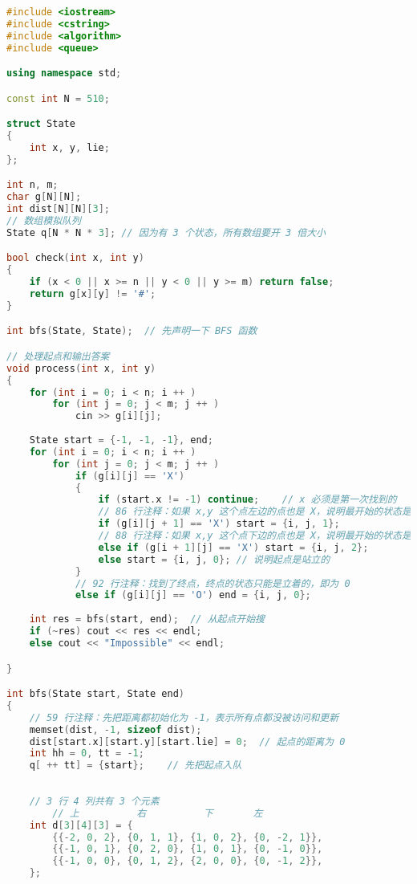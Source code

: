 \begin{lstlisting}[language=cpp]
#include <iostream>
#include <cstring>
#include <algorithm>
#include <queue>

using namespace std;

const int N = 510;

struct State
{
    int x, y, lie;
};

int n, m;
char g[N][N];
int dist[N][N][3];
// 数组模拟队列
State q[N * N * 3]; // 因为有 3 个状态，所有数组要开 3 倍大小

bool check(int x, int y)
{
    if (x < 0 || x >= n || y < 0 || y >= m) return false;
    return g[x][y] != '#';
}

int bfs(State, State);  // 先声明一下 BFS 函数

// 处理起点和输出答案
void process(int x, int y)
{
    for (int i = 0; i < n; i ++ )
        for (int j = 0; j < m; j ++ )
            cin >> g[i][j];
    
    State start = {-1, -1, -1}, end;
    for (int i = 0; i < n; i ++ )
        for (int j = 0; j < m; j ++ )
            if (g[i][j] == 'X')
            {
                if (start.x != -1) continue;    // x 必须是第一次找到的
                // 86 行注释：如果 x,y 这个点左边的点也是 X，说明最开始的状态是横向躺着的
                if (g[i][j + 1] == 'X') start = {i, j, 1};
                // 88 行注释：如果 x,y 这个点下边的点也是 X，说明最开始的状态是竖向躺着的
                else if (g[i + 1][j] == 'X') start = {i, j, 2};
                else start = {i, j, 0}; // 说明起点是站立的
            }
            // 92 行注释：找到了终点，终点的状态只能是立着的，即为 0
            else if (g[i][j] == 'O') end = {i, j, 0};   
    
    int res = bfs(start, end);  // 从起点开始搜
    if (~res) cout << res << endl;
    else cout << "Impossible" << endl;

}

int bfs(State start, State end)
{
    // 59 行注释：先把距离都初始化为 -1，表示所有点都没被访问和更新
    memset(dist, -1, sizeof dist);  
    dist[start.x][start.y][start.lie] = 0;  // 起点的距离为 0
    int hh = 0, tt = -1;
    q[ ++ tt] = {start};    // 先把起点入队
    
    
    // 3 行 4 列共有 3 个元素
        // 上          右          下       左
    int d[3][4][3] = {
        {{-2, 0, 2}, {0, 1, 1}, {1, 0, 2}, {0, -2, 1}},  
        {{-1, 0, 1}, {0, 2, 0}, {1, 0, 1}, {0, -1, 0}},  
        {{-1, 0, 0}, {0, 1, 2}, {2, 0, 0}, {0, -1, 2}},  
    };
    

\end{lstlisting}
